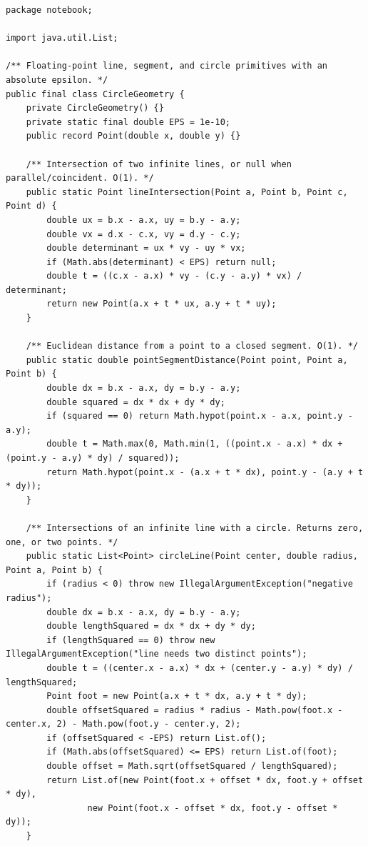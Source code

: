 \documentclass[10pt,letterpaper]{article}
\begin{document}
\begin{lstlisting}
package notebook;

import java.util.List;

/** Floating-point line, segment, and circle primitives with an absolute epsilon. */
public final class CircleGeometry {
    private CircleGeometry() {}
    private static final double EPS = 1e-10;
    public record Point(double x, double y) {}

    /** Intersection of two infinite lines, or null when parallel/coincident. O(1). */
    public static Point lineIntersection(Point a, Point b, Point c, Point d) {
        double ux = b.x - a.x, uy = b.y - a.y;
        double vx = d.x - c.x, vy = d.y - c.y;
        double determinant = ux * vy - uy * vx;
        if (Math.abs(determinant) < EPS) return null;
        double t = ((c.x - a.x) * vy - (c.y - a.y) * vx) / determinant;
        return new Point(a.x + t * ux, a.y + t * uy);
    }

    /** Euclidean distance from a point to a closed segment. O(1). */
    public static double pointSegmentDistance(Point point, Point a, Point b) {
        double dx = b.x - a.x, dy = b.y - a.y;
        double squared = dx * dx + dy * dy;
        if (squared == 0) return Math.hypot(point.x - a.x, point.y - a.y);
        double t = Math.max(0, Math.min(1, ((point.x - a.x) * dx + (point.y - a.y) * dy) / squared));
        return Math.hypot(point.x - (a.x + t * dx), point.y - (a.y + t * dy));
    }

    /** Intersections of an infinite line with a circle. Returns zero, one, or two points. */
    public static List<Point> circleLine(Point center, double radius, Point a, Point b) {
        if (radius < 0) throw new IllegalArgumentException("negative radius");
        double dx = b.x - a.x, dy = b.y - a.y;
        double lengthSquared = dx * dx + dy * dy;
        if (lengthSquared == 0) throw new IllegalArgumentException("line needs two distinct points");
        double t = ((center.x - a.x) * dx + (center.y - a.y) * dy) / lengthSquared;
        Point foot = new Point(a.x + t * dx, a.y + t * dy);
        double offsetSquared = radius * radius - Math.pow(foot.x - center.x, 2) - Math.pow(foot.y - center.y, 2);
        if (offsetSquared < -EPS) return List.of();
        if (Math.abs(offsetSquared) <= EPS) return List.of(foot);
        double offset = Math.sqrt(offsetSquared / lengthSquared);
        return List.of(new Point(foot.x + offset * dx, foot.y + offset * dy),
                new Point(foot.x - offset * dx, foot.y - offset * dy));
    }


\end{lstlisting}
\end{document}
